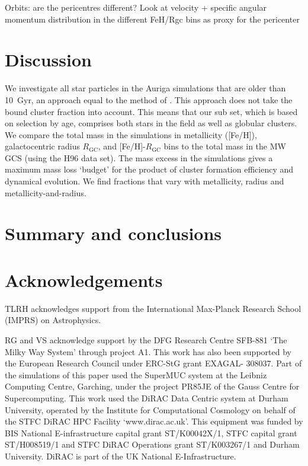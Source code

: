 \documentclass[a4paper,fleqn,usenatbib]{mnras}
\begin{document}
Orbits: are the pericentres different? Look at velocity + specific angular momentum distribution in the different FeH/Rgc bins as proxy for the pericenter




\section{Discussion}
\label{sec:discussion}

We investigate all star particles in the Auriga simulations that are older than 10~Gyr,
an approach equal to the method of \citep{2017MNRAS.465.3622R}. This approach does not
take the bound cluster fraction \citep[e.g.][]{2012MNRAS.426.3008K} into account. This
means that our sub set, which is based on selection by age, comprises both stars in the
field as well as globular clusters. We compare the total mass in the simulations in 
metallicity ([Fe/H]), galactocentric radius $R_{\text{GC}}$, and [Fe/H]-$R_{\text{GC}}$ 
bins to the total mass in the MW GCS (using the H96 data set). The mass excess in the
simulations gives a maximum mass loss `budget' for the product of cluster formation 
efficiency and dynamical evolution. We find fractions that vary with metallicity,
radius and metallicity-and-radius.



\section{Summary and conclusions}
\label{sec:conclusions}


\section*{Acknowledgements}
TLRH acknowledges support from the International Max-Planck Research School (IMPRS) on Astrophysics.


RG and VS acknowledge support by the DFG Research Centre SFB-881 `The
Milky Way System' through project A1. This work has also been
supported by the European Research Council under ERC-StG grant
EXAGAL- 308037. Part of the simulations of this paper used the
SuperMUC system at the Leibniz Computing Centre, Garching,
under the project PR85JE of the Gauss Centre for Supercomputing.
This work used the DiRAC Data Centric system at Durham
University, operated by the Institute for Computational Cosmology
on behalf of the STFC DiRAC HPC Facility `www.dirac.ac.uk'.
This equipment was funded by BIS National E-infrastructure capital 
grant ST/K00042X/1, STFC capital grant ST/H008519/1 and
STFC DiRAC Operations grant ST/K003267/1 and Durham University. 
DiRAC is part of the UK National E-Infrastructure.
\end{document}
